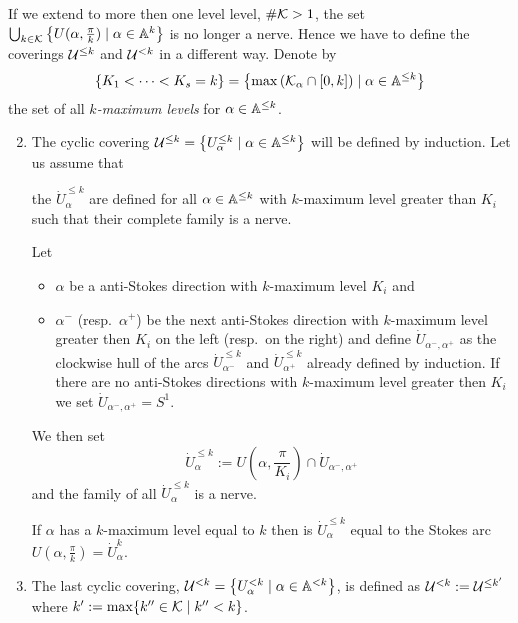 If we extend to more then one level level, $\#\mathcal{K}>1$, the set
$\bigcup_{k\in\mathcal{K}}\left\{U(\alpha,\frac{\pi}{k})\mid\alpha\in\mathbb{A}^{k}\right\}$ is
no longer a nerve.
Hence we have to define the coverings $\mathcal{U}^{\leq k}$ and $\mathcal{U}^{<k}$ in a
different way.
Denote by
\[
  \left\{K_1<\cdots<K_s=k\right\}
  =\left\{\max\left(\mathcal{K}_\alpha\cap[0,k]\right)\mid\alpha\in\mathbb{A}^{\leq k}\right\}
\]
the set of all \emph{$k$-maximum levels} for $\alpha\in\mathbb{A}^{\leq k}$.
\begin{enumerate}
  \setcounter{enumi}{1}
  \item The cyclic covering
    $\mathcal{U}^{\leq k}=\left\{U_\alpha^{\leq k}\mid\alpha\in\mathbb{A}^{\leq k}\right\}$
    will be defined by induction.
    Let us assume that
    \begin{einr}
      the $\dot U_\alpha^{\leq k}$ are defined for all $\alpha\in\mathbb{A}^{\leq k}$
      with $k$-maximum level greater than $K_i$ such that their complete family
      is a nerve.
    \end{einr}
    Let
    \begin{itemize}
      \item $\alpha$ be a anti-Stokes direction with $k$-maximum level $K_i$
        and
      \item $\alpha^-$ (resp.\ $\alpha^+$) be the next anti-Stokes direction
        with $k$-maximum level greater then $K_i$ on the left (resp.\ on the
        right) and define $\dot U_{\alpha^-,\alpha^+}$ as the clockwise hull of
        the arcs $\dot U_{\alpha^-}^{\leq k}$ and $\dot U_{\alpha^+}^{\leq k}$
        already defined by induction.
        If there are no anti-Stokes directions with $k$-maximum level greater
        then $K_i$ we set $\dot U_{\alpha^-,\alpha^+}=S^1$.
    \end{itemize}
    We then set
    \[
      \dot U_\alpha^{\leq k}
        :=U\left(\alpha,\frac{\pi}{K_i}\right)\cap\dot U_{\alpha^-,\alpha^+}
    \]
    and the family of all $\dot U_\alpha^{\leq k}$ is a nerve.
    \begin{rem}
      If $\alpha$ has a $k$-maximum level equal to $k$ then is
      $\dot U_\alpha^{\leq k}$ equal to the Stokes arc
      $U\left(\alpha,\frac{\pi}{k}\right)=\dot U_\alpha^k$.
    \end{rem}
\end{enumerate}

\begin{enumerate}
  \setcounter{enumi}{2}
\item The last cyclic covering,
  $\mathcal{U}^{<k}=\left\{U_{\alpha}^{<k}\mid\alpha\in\mathbb{A}^{<k}\right\}$, is defined as
  $\mathcal{U}^{<k}:=\mathcal{U}^{\leq k'}$ where $k':=\max\{k''\in\mathcal{K}\mid k''<k\}$.
\end{enumerate}


